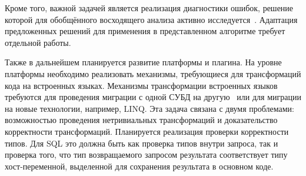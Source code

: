 Кроме того, важной задачей является реализация диагностики ошибок, решение которой для обобщённого восходящего анализа активно исследуется~\cite{RNGLRSyntaxerror1,RNGLRSyntaxerror2, RNGLRSyntaxerror3, RNGLRSyntaxerror4}. Адаптация предложенных решений для применения в представленном алгоритме требует отдельной работы.

Также в дальнейшем планируется развитие платформы и плагина. На уровне платформы необходимо реализовать механизмы, требующиеся для трансформаций кода на встроенных языках. Механизмы трансформации встроенных языков требуются для проведения миграции с одной СУБД на другую~\cite{Syrcose} или для миграции на новые технологии, например, LINQ. Эта задача связана с двумя проблемами: возможностью проведения нетривиальных трансформаций и доказательство корректности трансформаций. Планируется реализация проверки корректности типов. Для SQL это должна быть как проверка типов внутри запроса, так и проверка того, что тип возвращаемого запросом результата соответствует типу хост-переменной, выделенной для сохранения результата в основном коде.

\clearpage
